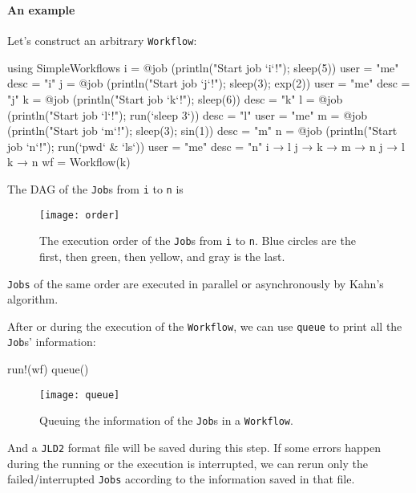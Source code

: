 \begin{frame}
    \frametitle{\subsecname}
    \framesubtitle{An example}

    Let's construct an arbitrary \texttt{Workflow}:
    {\scriptsize
    \begin{algorithmblock}
        \begin{juliaverbatim}
using SimpleWorkflows
i = @job (println("Start job `i`!"); sleep(5)) user = "me" desc = "i"
j = @job (println("Start job `j`!"); sleep(3); exp(2)) user = "me" desc = "j"
k = @job (println("Start job `k`!"); sleep(6)) desc = "k"
l = @job (println("Start job `l`!"); run(`sleep 3`)) desc = "l" user = "me"
m = @job (println("Start job `m`!"); sleep(3); sin(1)) desc = "m"
n = @job (println("Start job `n`!"); run(`pwd` & `ls`)) user = "me" desc = "n"
i → l
j → k → m → n
j → l
k → n
wf = Workflow(k)
        \end{juliaverbatim}
    \end{algorithmblock}
    }

    \framebreak

    The DAG of the \texttt{Job}s from \texttt{i} to \texttt{n} is

    \begin{figure}[H]
        \centering
        \texttt{[image: order]}
        \caption{The execution order of the \texttt{Job}s from \texttt{i} to \texttt{n}.
            Blue circles are the first, then green, then yellow, and gray is the last.}
        \label{fig:order}
    \end{figure}

    \texttt{Jobs} of the same order are executed in parallel or asynchronously by
    Kahn's algorithm.

    \framebreak

    After or during the execution of the \texttt{Workflow}, we can use \texttt{queue} to
    print all the \texttt{Job}s' information:

    {\scriptsize
    \begin{algorithmblock}
        \begin{juliaverbatim}
run!(wf)
queue()
        \end{juliaverbatim}
    \end{algorithmblock}
    }

    \begin{figure}[H]
        \centering
        \texttt{[image: queue]}
        \caption{Queuing the information of the \texttt{Job}s in a \texttt{Workflow}.}
        \label{fig:queue}
    \end{figure}

    And a \texttt{JLD2} format file will be saved during this step. If some errors happen
    during the running or the execution is interrupted, we can rerun only the
    failed/interrupted \texttt{Jobs} according to the information saved in that file.
\end{frame}
